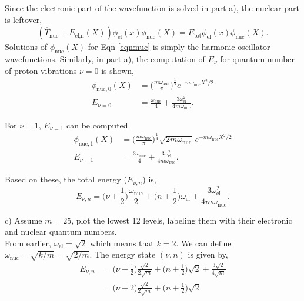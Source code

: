 \documentclass{article}
\begin{document}
Since the electronic part of the wavefunction is solved in part a), the
nuclear part is leftover,
\begin{equation}
  (\hat{T}_{\text{nuc}} + E_{\text{el,n}}(X))\phi_{\text{el}}(x)\phi_{\text{nuc}}(X)
  = E_{\text{tot}}\phi_{\text{el}}(x)\phi_{\text{nuc}}(X). \label{eqn:nuc}
\end{equation}
Solutions of $\phi_{\text{nuc}}(X)$ for Eqn \eqref{eqn:nuc} is simply the harmonic
oscillator wavefunctions. Similarly, in part a), the computation of $E_{\nu}$ for
quantum number of proton vibrations $\nu=0$ is shown,
\begin{align}
  \phi_{\text{nuc},0}(X) & = \Bigg(\frac{m\omega_{\text{nuc}}}{\pi}\Bigg)^{\frac{1}{4}}
  e^{-m\omega_{\text{nuc}}X^2/2} \\
  E_{\nu=0} & = \frac{\omega_{\text{nuc}}}{4} + \frac{3\omega^2_{\text{el}}}{4m\omega_{\text{nuc}}}.
\end{align}

For $\nu=1$, $E_{\nu=1}$ can be computed
\begin{align}
  \phi_{\text{nuc},1}(X) & = \Bigg(\frac{m\omega_{\text{nuc}}}{\pi}\Bigg)^{\frac{1}{4}}
  \sqrt{2m\omega_{\text{nuc}}}\,e^{-m\omega_{\text{nuc}}X^2/2} \\
  E_{\nu=1} & = \frac{3\omega_{\text{nuc}}}{4} + \frac{3\omega^2_{\text{el}}}{4m\omega_{\text{nuc}}}.
\end{align}

Based on these, the total energy ($E_{\nu,n}$) is,
\begin{equation}
  E_{\nu,n}=\Big(\nu+\frac{1}{2}\Big)\frac{\omega_{\text{nuc}}}{2}
  + \Big(n+\frac{1}{2}\Big)\omega_{\text{el}}
  + \frac{3\omega^2_{\text{el}}}{4m\omega_{\text{nuc}}}.
\end{equation}

\noindent c) Assume $m=25$, plot the lowest 12 levels, labeling them with their
electronic and nuclear quantum numbers.
\\


From earlier, $\omega_{\text{el}}=\sqrt{2}$ which means that $k=2$. We
can define $\omega_{\text{nuc}}=\sqrt{k/m}=\sqrt{2/m}$. The energy state $(\nu,n)$
is given by,
\begin{align}
  E_{\nu,n} & = \Big(\nu+\frac{1}{2}\Big)\frac{\sqrt{2}}{2\sqrt{m}}
  + \Big(n+\frac{1}{2}\Big)\sqrt{2}
  + \frac{3\sqrt{2}}{4\sqrt{m}} \nonumber\\
  & = \Big(\nu + 2\Big)\frac{\sqrt{2}}{2\sqrt{m}}
  + \Big(n+\frac{1}{2}\Big)\sqrt{2}
\end{align}
\end{document}
